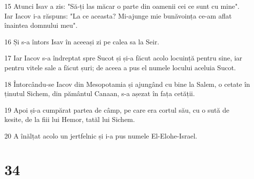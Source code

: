 \par 15 Atunci Isav a zis: "Să-ți las măcar o parte din oamenii cei ce sunt cu mine". Iar Iacov i-a răspuns: "La ce aceasta? Mi-ajunge mie bunăvoința ce-am aflat înaintea domnului meu".
\par 16 Și s-a întors Isav în aceeași zi pe calea sa la Seir.
\par 17 Iar Iacov s-a îndreptat spre Sucot și și-a făcut acolo locuință pentru sine, iar pentru vitele sale a făcut șuri; de aceea a pus el numele locului aceluia Sucot.
\par 18 Întorcându-se Iacov din Mesopotamia și ajungând cu bine la Salem, o cetate în ținutul Sichem, din pământul Canaan, s-a așezat în fața cetății.
\par 19 Apoi și-a cumpărat partea de câmp, pe care era cortul său, cu o sută de kesite, de la fiii lui Hemor, tatăl lui Sichem.
\par 20 A înălțat acolo un jertfelnic și i-a pus numele El-Elohe-Israel.

\chapter{34}


